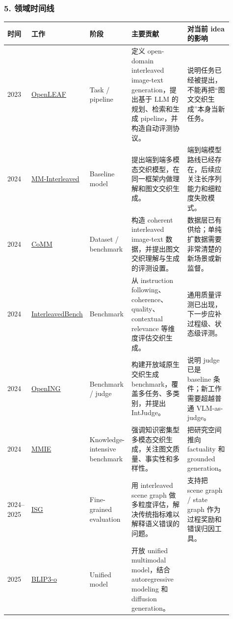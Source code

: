 \subsubsection*{5. 领域时间线}

{\small
\setlength{\tabcolsep}{3pt}
\renewcommand{\arraystretch}{1.12}
\begin{longtable}{p{0.08\linewidth} p{0.20\linewidth} p{0.16\linewidth} p{0.31\linewidth} p{0.16\linewidth}}
\toprule
\textbf{时间} & \textbf{工作} & \textbf{阶段} & \textbf{主要贡献} & \textbf{对当前 idea 的影响} \\
\midrule
2023 &
\href{https://arxiv.org/abs/2310.07749}{OpenLEAF} &
Task / pipeline &
定义 open-domain interleaved image-text generation，提出基于 LLM 的规划、检索和生成 pipeline，并构造自动评测协议。 &
说明任务已经被提出，不能再把“图文交织生成”本身当新任务。 \\
\midrule
2024 &
\href{https://arxiv.org/abs/2401.10208}{MM-Interleaved} &
Baseline model &
提出端到端多模态交织模型，在同一框架内做理解和图文交织生成。 &
端到端模型路线已经存在，后续应关注长序列能力和细粒度失败模式。 \\
\midrule
2024 &
\href{https://arxiv.org/abs/2406.10462}{CoMM} &
Dataset / benchmark &
构造 coherent interleaved image-text 数据，并提出图文交织理解与生成的评测设置。 &
数据层已有供给；单纯扩数据需要非常清楚的新场景或新监督。 \\
\midrule
2024 &
\href{https://arxiv.org/abs/2406.14643}{InterleavedBench} &
Benchmark &
从 instruction following、coherence、quality、contextual relevance 等维度评估交织生成。 &
通用质量评测已出现，下一步应补过程级、状态级评测。 \\
\midrule
2024 &
\href{https://arxiv.org/abs/2411.18499}{OpenING} &
Benchmark / judge &
构建开放域原生交织生成 benchmark，覆盖多任务、多类别，并提出 IntJudge。 &
说明 judge 已是 baseline 条件；新工作需要超越普通 VLM-as-judge。 \\
\midrule
2024 &
\href{https://arxiv.org/abs/2410.10139}{MMIE} &
Knowledge-intensive benchmark &
强调知识密集型多模态交织生成，关注图文质量、事实性和多样性。 &
把研究空间推向 factuality 和 grounded generation。 \\
\midrule
2024--2025 &
\href{https://arxiv.org/abs/2411.17188}{ISG} &
Fine-grained evaluation &
用 interleaved scene graph 做多粒度评估，解决传统指标难以解释语义错误的问题。 &
支持把 scene graph / state graph 作为过程奖励和错误归因工具。 \\
\midrule
2025 &
\href{https://arxiv.org/abs/2505.09568}{BLIP3-o} &
Unified model &
开放 unified multimodal model，结合 autoregressive modeling 和 diffusion generation。 &

\end{longtable}}
